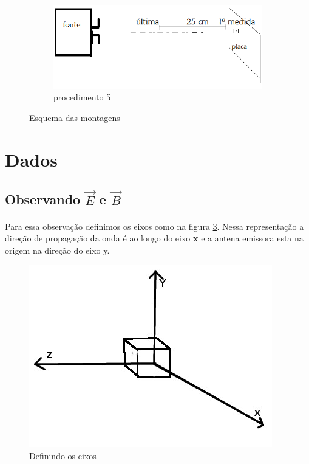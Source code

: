 \documentclass[a4paper,11pt]{article}
\begin{document}
\begin{figure}[!htp]
			\begin{subfigure}[b]{0.3\textwidth}
					\centering					
					\includegraphics[scale=0.6]{placa.png}
					\caption{procedimento 5}
					\label{placa}
			\end{subfigure}
			
			
	\caption{Esquema das montagens}
	\end{figure}
\FloatBarrier

\newpage
\section{Dados}

	\subsection{Observando $ \vec{E} $ e $ \vec{B} $}
	\paragraph{}	Para essa observação definimos os eixos como na figura \ref{eixos}. Nessa representação a direção de propagação da onda é ao longo do eixo \textbf{x} e a antena emissora esta na origem na direção do eixo y.  
		\begin{figure}[!htp]
 			 \centering
  			  \includegraphics[scale = 0.5]{eixos.jpg}
  				\caption{Definindo os eixos}
  				\label{eixos}
		\end{figure}
		
\end{document}
